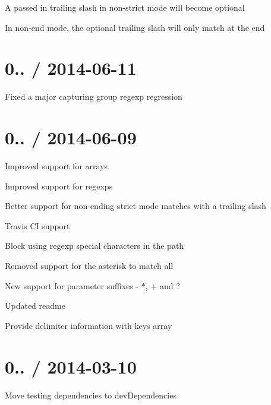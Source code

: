 \begin{DoxyItemize}
\item A passed in trailing slash in non-\/strict mode will become optional
\item In non-\/end mode, the optional trailing slash will only match at the end
\end{DoxyItemize}

\section*{0.. / 2014-\/06-\/11 }


\begin{DoxyItemize}
\item Fixed a major capturing group regexp regression
\end{DoxyItemize}

\section*{0.. / 2014-\/06-\/09 }


\begin{DoxyItemize}
\item Improved support for arrays
\item Improved support for regexps
\item Better support for non-\/ending strict mode matches with a trailing slash
\item Travis CI support
\item Block using regexp special characters in the path
\item Removed support for the asterisk to match all
\item New support for parameter suffixes -\/ {\ttfamily $\ast$}, {\ttfamily +} and {\ttfamily ?}
\item Updated readme
\item Provide delimiter information with keys array
\end{DoxyItemize}

\section*{0.. / 2014-\/03-\/10 }


\begin{DoxyItemize}
\item Move testing dependencies to {\ttfamily dev\+Dependencies}
\end{DoxyItemize}

